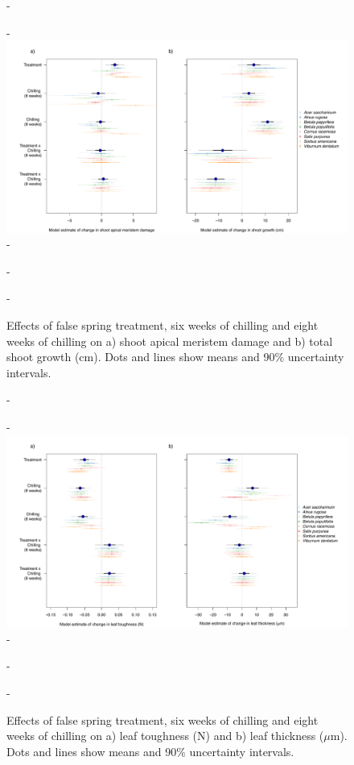 \documentclass{article}\usepackage[]{graphicx}\usepackage[]{color}
\begin{document}
  {\begin{figure} [H]
  -\begin{center}
  -\includegraphics[width=18cm]{..//analyses/figures/mu_growth.pdf} 
  -\caption{Effects of false spring treatment, six weeks of chilling and eight weeks of chilling on a) shoot apical meristem damage and b) total shoot growth (cm). Dots and lines show means and 90\% uncertainty intervals. }\label{fig:mugrowth}
  -\end{center}
  -\end{figure}}
  
  {\begin{figure} [H]
  -\begin{center}
  -\includegraphics[width=18cm]{..//analyses/figures/mu_leaftraits.pdf} 
  -\caption{Effects of false spring treatment, six weeks of chilling and eight weeks of chilling on a) leaf toughness (N) and b) leaf thickness ($\mu$m). Dots and lines show means and 90\% uncertainty intervals. }\label{fig:muleaf}
  -\end{center}
  -\end{figure}}
  
\end{document}
